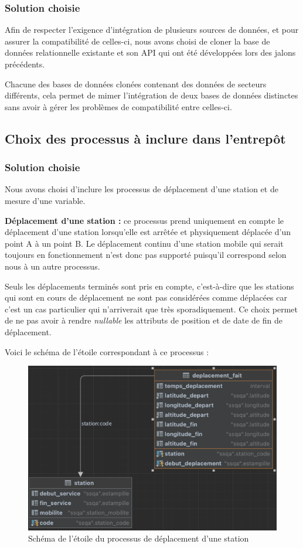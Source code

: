 \documentclass{article}
\begin{document}
\subsubsection*{Solution choisie}
Afin de respecter l'exigence d'intégration de plusieurs sources de données, et pour
assurer la compatibilité de celles-ci, nous avons choisi de cloner la base de données
relationnelle existante et son API qui ont été développées lors des jalons précédents.

Chacune des bases de données clonées contenant des données de secteurs différents,
cela permet de mimer l'intégration de deux bases de données distinctes sans avoir à
gérer les problèmes de compatibilité entre celles-ci.

\subsection{Choix des processus à inclure dans l'entrepôt}
\subsubsection*{Solution choisie}
Nous avons choisi d'inclure les processus de déplacement d'une station et 
de mesure d'une variable.

\textbf{Déplacement d'une station :} ce processus prend uniquement 
en compte le déplacement d'une station 
lorsqu'elle est arrêtée et physiquement déplacée d'un point A à un point B. 
Le déplacement continu d'une station mobile qui serait toujours 
en fonctionnement n'est donc pas supporté puisqu'il correspond
selon nous à un autre processus.

Seuls les déplacements terminés sont pris en compte, c'est-à-dire que
les stations qui sont en cours de déplacement ne sont pas considérées
comme déplacées car c'est un cas particulier qui n'arriverait que
très sporadiquement. Ce choix permet de ne pas avoir à rendre \textit{nullable}
les attributs de position et de date de fin de déplacement.

Voici le schéma de l'étoile correspondant à ce processus :

\begin{figure}[ht]
\centering
\includegraphics[scale=0.5]{deplacement_fait.png}
\caption{Schéma de l'étoile du processus de déplacement d'une station}
\end{figure}
\end{document}
